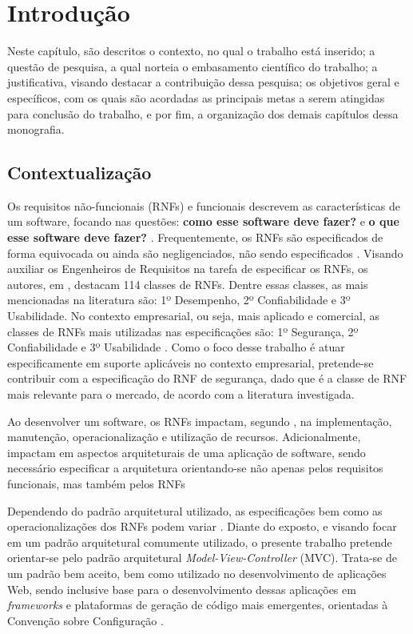 \chapter{Introdução}
\label{chap:introducao}

Neste capítulo, são descritos o contexto, no qual o trabalho está inserido; a questão de pesquisa, a qual norteia o embasamento científico do trabalho;  a justificativa, visando destacar a contribuição dessa pesquisa; os objetivos geral e específicos, com os quais são acordadas as principais metas a serem atingidas para conclusão do trabalho, e por fim, a organização dos demais capítulos dessa monografia.

\section{Contextualização}

Os requisitos não-funcionais (RNFs) e funcionais descrevem as características de um software, focando nas questões: \textbf{como esse software deve fazer?} e \textbf{o que esse software deve fazer?}  \cite{sommerville1997requirements}. Frequentemente, os RNFs são especificados de forma equivocada ou ainda são negligenciados, não sendo especificados \cite{eckhardt2016non}. Visando auxiliar os Engenheiros de Requisitos na tarefa de especificar os RNFs, os autores, em \cite{mairiza2010investigation}, destacam 114 classes de RNFs. Dentre essas classes, as mais mencionadas na literatura são: 1º Desempenho, 2º Confiabilidade e  3º Usabilidade. No contexto empresarial, ou seja, mais aplicado e comercial, as classes de RNFs mais utilizadas nas especificações são: 1º Segurança, 2º Confiabilidade e 3º Usabilidade \cite{eckhardt2016non}. Como o foco desse trabalho é atuar especificamente em suporte aplicáveis no contexto empresarial, pretende-se contribuir com a especificação do RNF de segurança, dado que é a classe de RNF mais relevante para o mercado, de acordo com a literatura investigada.

Ao desenvolver um software, os RNFs impactam, segundo \cite{eckhardt2016non}, na implementação, manutenção, operacionalização e utilização de recursos. Adicionalmente, impactam em aspectos arquiteturais de uma aplicação de software, sendo necessário especificar a arquitetura orientando-se não apenas pelos requisitos funcionais, mas também pelos RNFs \cite{buschmann1996system}

Dependendo do padrão arquitetural utilizado, as especificações bem como as operacionalizações dos RNFs podem variar \cite{chung2012non}. Diante do exposto, e visando focar em um padrão arquitetural comumente utilizado, o presente trabalho pretende orientar-se pelo padrão arquitetural \textit{Model-View-Controller} (MVC). Trata-se de um padrão bem aceito, bem como utilizado no desenvolvimento de aplicações Web, sendo inclusive base para o desenvolvimento dessas aplicações em \textit{frameworks} e plataformas de geração de código mais emergentes, orientadas à Convenção sobre Configuração \cite{jailia2016behavior}.


